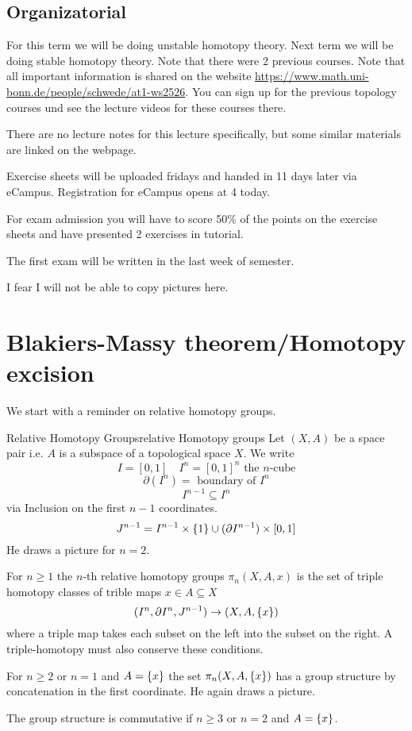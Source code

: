 \documentclass[language=english]{TemplateLecture}
\begin{document}

\subsection*{Organizatorial}

For this term we will be doing unstable homotopy theory. Next term we will be doing stable homotopy theory. Note that there were 2 previous courses. Note that all important information is shared on the website \url{https://www.math.uni-bonn.de/people/schwede/at1-ws2526}. You can sign up for the previous topology courses und see the lecture videos for these courses there.

There are no lecture notes for this lecture specifically, but some similar materials are linked on the webpage.

Exercise sheets will be uploaded fridays and handed in 11 days later via eCampus. Registration for eCampus opens at 4 today.

For exam admission you will have to score 50\% of the points on the exercise sheets and have presented 2 exercises in tutorial.

The first exam will be written in the last week of semester.

I fear I will not be able to copy pictures here.

\newpage

\setcounter{chapter}{1}

\section{Blakiers-Massy theorem/Homotopy excision}

We start with a reminder on relative homotopy groups.

\begin{defi}{Relative Homotopy Groups}{relative Homotopy groups}
    Let \((X,A)\) be a space pair i.e. \(A\) is a subspace of a topological space \(X\). We write
    \[I = [0,1] \quad I^{n} = [0,1]^n \text{ the } n\text{-cube}\]
    \[\partial(I^n) = \text{ boundary of } I^n\]
    \[I^{n-1} \subseteq I^n\]
    via Inclusion on the first \(n-1\) coordinates.
    \[J^{n-1} = I^{n-1}\times \{1\} \cup (\partial I^{n-1})\times [0,1]\]
    He draws a picture for \(n = 2\).

    For \(n \geq 1\) the \(n\)-th relative homotopy groups \(\pi_n(X,A,x)\) is the set of triple homotopy classes of trible maps \(x \in A\subseteq X\)
    \[(I^n, \partial I^n,J^{n-1}) \to (X,A, \{x\})\]
    where a triple map takes each subset on the left into the subset on the right. A triple-homotopy must also conserve these conditions.

    For \(n \geq 2\) or \(n = 1\) and \(A = \{x\}\) the set \(\pi_n(X,A,\{x\})\) has a group structure by concatenation in the first coordinate. He again draws a picture.

    The group structure is commutative if \(n \geq 3\) or \(n = 2\) and \(A = \{x\}\).
\end{defi}
\end{document}
